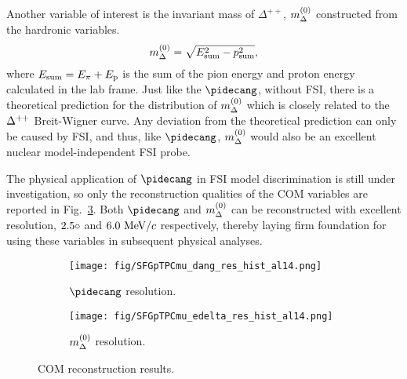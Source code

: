     Another variable of interest is the invariant mass of $\Delta^{++}$, $m_{\Delta}^{(0)}$ constructed from the hardronic variables.
    \begin{equation}
        m_{\Delta}^{(0)}=\sqrt{E_{\textrm{sum}}^2-p_{\textrm{sum}}^2},
    \end{equation}
    where $E_{\textrm{sum}}=E_{\pi}+E_\textrm{p}$ is the sum of the pion energy and proton energy calculated in the lab frame. 
    Just like the $\pidecang$, without FSI, there is a theoretical prediction for the distribution of $m_{\Delta}^{(0)}$ which is closely related to the $\Delta^{++}$  Breit-Wigner curve. 
    Any deviation from the theoretical prediction can only be caused by FSI, and thus, like $\pidecang$, $m_{\Delta}^{(0)}$ would also be an excellent nuclear model-independent FSI probe.

    The physical application of $\pidecang$ in FSI model discrimination is still under investigation, so only the reconstruction qualities of the COM variables are reported in Fig.~\ref{fig:1pi-com-res}. 
    Both $\pidecang$ and $m_{\Delta}^{(0)}$ can be reconstructed with excellent resolution, $2.5\circ$ and $6.0~\textrm{MeV}/c$ respectively, thereby laying firm foundation for using these variables in subsequent physical analyses.

   \begin{figure}[!htb] 
       \centering
       \begin{subfigure}{0.45\textwidth}
            \texttt{[image: fig/SFGpTPCmu\_dang\_res\_hist\_al14.png]}
            \caption{$\pidecang$ resolution.}
            \label{fig:1pi-decang-res}
       \end{subfigure}
       \begin{subfigure}{0.45\textwidth}
            \texttt{[image: fig/SFGpTPCmu\_edelta\_res\_hist\_al14.png]}
            \caption{$m_{\Delta}^{(0)}$ resolution.}
            \label{fig:1pi-mdel-res}
       \end{subfigure}
       \caption{COM reconstruction results.}
       \label{fig:1pi-com-res}
    \end{figure}
 

